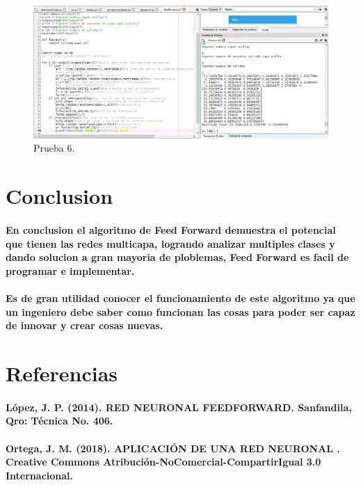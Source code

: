 \documentclass[10pt,a4paper]{article}
\begin{document}
\begin{figure}[H]
\includegraphics[scale=0.4] {p6.jpg}
\caption{Prueba 6.}
\label{fig:p6}
\end{figure}
\section{Conclusion}
\paragraph{En conclusion el algoritmo de  Feed Forward demuestra el potencial que tienen las redes multicapa, logrando analizar multiples clases y dando solucion a gran mayoria de ploblemas,  Feed Forward
es facil de programar e implementar.}
\paragraph{Es de gran utilidad conocer el funcionamiento de este algoritmo  ya que un ingeniero debe saber como funcionan las cosas para poder ser capaz de innovar y crear cosas nuevas.}

\section{Referencias}
\paragraph{L\'opez, J. P. (2014). RED NEURONAL FEEDFORWARD. Sanfandila, Qro: T\'ecnica No. 406.}
\paragraph{Ortega, J. M. (2018). APLICACI\'ON DE UNA RED NEURONAL . Creative Commons Atribuci\'on-NoComercial-CompartirIgual 3.0 Internacional.}
\end{document}
